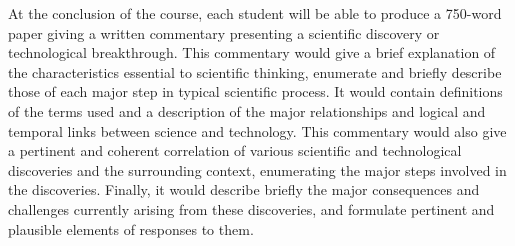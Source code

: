 {At the conclusion of the course, each student will be able to produce a 750-word paper giving a written 
commentary presenting a scientific discovery or technological breakthrough. This commentary would 
give a brief explanation of the characteristics essential to scientific thinking, enumerate and briefly 
describe those of each major step in typical scientific process. It would contain definitions of the terms 
used and a description of the major relationships and logical and temporal links between science and 
technology. This commentary would also give a pertinent and coherent correlation of various scientific 
and technological discoveries and the surrounding context, enumerating the major steps involved in the 
discoveries. Finally, it would describe briefly the major consequences and challenges currently arising 
from these discoveries, and formulate pertinent and plausible elements of responses to them. 
}
